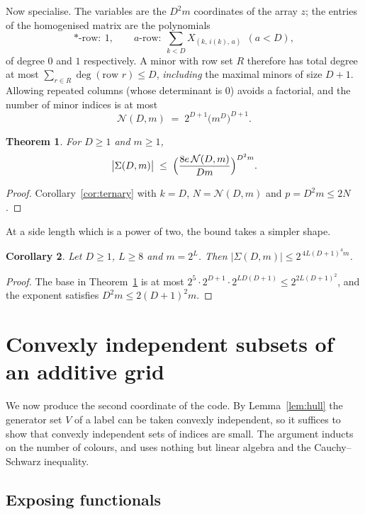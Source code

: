 \documentclass[11pt,a4paper]{article}
\theoremstyle{plain}
\newtheorem{theorem}{Theorem}[section]
\newtheorem{corollary}[theorem]{Corollary}
\theoremstyle{definition}
\begin{document}
Now specialise. The variables are the $D^2m$ coordinates of the array $z$; the entries of
the homogenised matrix are the polynomials
\[
  \ast\text{-row}:\ 1,
  \qquad
  a\text{-row}:\ \sum_{k<D}X_{(k,\,i(k),\,a)} \ \ (a<D),
\]
of degree $0$ and $1$ respectively. A minor with row set $R$ therefore has total degree at
most $\sum_{r\in R}\deg(\text{row } r)\le D$, \emph{including} the maximal minors of size
$D+1$. Allowing repeated columns (whose determinant is $0$) avoids a factorial, and the
number of minor indices is at most
\[
  \mathcal{N}(D,m)\;=\;2^{D+1}\bigl(m^{D}\bigr)^{D+1}.
\]

\begin{theorem}\label{thm:minorsigns}
For $D\ge1$ and $m\ge1$,
\[
  \bigl|\Sigma(D,m)\bigr|\;\le\;\Bigl(\frac{8e\,\mathcal{N}(D,m)}{Dm}\Bigr)^{D^2m}.
\]
\end{theorem}

\begin{proof}
Corollary~\ref{cor:ternary} with $k=D$, $N=\mathcal{N}(D,m)$ and $p=D^2m\le2N$.
\end{proof}

At a side length which is a power of two, the bound takes a simpler shape.

\begin{corollary}\label{cor:signpow}
Let $D\ge1$, $L\ge8$ and $m=2^{L}$. Then $\bigl|\Sigma(D,m)\bigr|\le2^{\,4L(D+1)^{4}m}$.
\end{corollary}

\begin{proof}
The base in Theorem~\ref{thm:minorsigns} is at most
$2^{5}\cdot2^{D+1}\cdot2^{LD(D+1)}\le2^{2L(D+1)^{2}}$, and the exponent satisfies
$D^{2}m\le2(D+1)^{2}m$.
\end{proof}

\section{Convexly independent subsets of an additive grid}\label{sec:vertices}

We now produce the second coordinate of the code. By Lemma~\ref{lem:hull} the generator set $V$
of a label can be taken convexly independent, so it suffices to show that convexly independent
sets of indices are small. The argument inducts on the number of colours, and uses nothing but
linear algebra and the Cauchy--Schwarz inequality.

\subsection{Exposing functionals}
\end{document}

